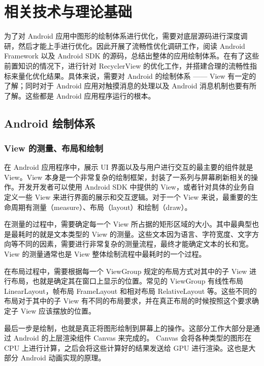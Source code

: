 \chapter{相关技术与理论基础}

为了对 Android 应用中图形的绘制体系进行优化，需要对底层源码进行深度调研，然后才能上手进行优化。因此开展了流畅性优化调研工作，阅读 Android Framework 以及 Android SDK 的源码，总结出整体的应用绘制体系。在有了这些前置知识的情况下，进行针对 RecyclerView 的优化工作，并搭建合理的流畅性指标来量化优化结果。具体来说，需要对 Android 的绘制体系 —— View 有一定的了解；同时对于 Android 应用对触摸消息的处理以及 Android 消息机制也要有所了解。这些都是 Android 应用程序运行的根本。

\section{Android 绘制体系}

\subsection{View 的测量、布局和绘制}

在 Android 应用程序中，展示 UI 界面以及与用户进行交互的最主要的组件就是 View。View 本身是一个非常复杂的绘制框架，封装了一系列与屏幕刷新相关的操作。开发开发者可以使用 Android SDK 中提供的 View，或者针对具体的业务自定义一些 View 来进行界面的展示和交互逻辑。对于一个 View 来说，最重要的生命周期有测量（measure）、布局（layout）和绘制（draw）\cite{rountev2014static}。

在测量的过程中，需要确定每一个 View 所占据的矩形区域的大小。其中最典型也是最耗时的就是文本类型的 View 的测量。这些文本因为语言、字符宽度、文字方向等不同的因素，需要进行非常复杂的测量流程，最终才能确定文本的长和宽。View 的测量通常也是 View 整体绘制流程中最耗时的一个过程。

在布局过程中，需要根据每一个 ViewGroup 规定的布局方式对其中的子 View 进行布局，也就是确定其在窗口上显示的位置。常见的 ViewGroup 有线性布局 LinearLayout，帧布局 FrameLayout 和相对布局 RelativeLayout 等。这些不同的布局对于其中的子 View 有不同的布局要求，并在真正布局的时候按照这个要求确定子 View 应该摆放的位置。

最后一步是绘制，也就是真正将图形绘制到屏幕上的操作。这部分工作大部分是通过 Android 的上层渲染组件 Canvas 来完成的。 Canvas 会将各种类型的图形在 CPU 上进行计算，之后会将这些计算好的结果发送给 GPU 进行渲染。这也是大部分 Android 动画实现的原理。

